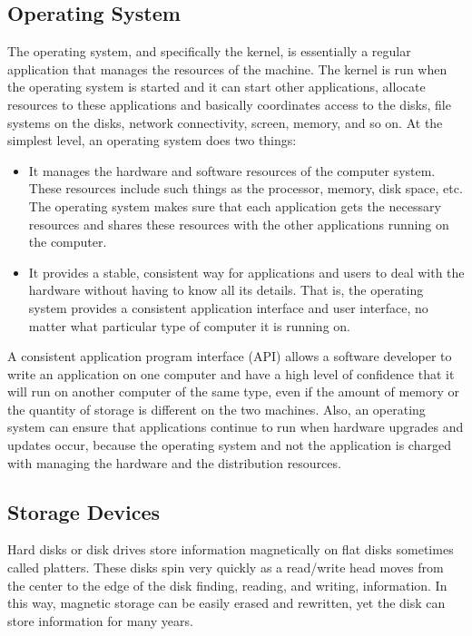 \subsection{Operating System} The operating system, and specifically
the kernel, is essentially a regular application that manages the
resources of the machine. The kernel is run when the operating system
is started and it can start other applications, allocate resources to
these applications and basically coordinates access to the disks, file
systems on the disks, network connectivity, screen, memory, and so on.
At the simplest level, an operating system does two things:
\begin{itemize}
\item It manages the hardware and software resources of the computer
  system.  These resources include such things as the processor,
  memory, disk space, etc.  The operating system makes sure that each
  application gets the necessary resources and shares these resources
  with the other applications running on the computer.

\item It provides a stable, consistent way for applications and users
  to deal with the hardware without having to know all its details.
  That is, the operating system provides a consistent application
  interface and user interface, no matter what particular type of
  computer it is running on.
\end{itemize}

A consistent application program interface (API) allows a software
developer to write an application on one computer and have a high
level of confidence that it will run on another computer of the same
type, even if the amount of memory or the quantity of storage is
different on the two machines.  Also, an operating system can ensure
that applications continue to run when hardware upgrades and updates
occur, because the operating system and not the application is charged
with managing the hardware and the distribution resources.


\subsection{Storage Devices}
Hard disks or disk drives store information magnetically on flat disks
sometimes called platters.  These disks spin very quickly as a
read/write head moves from the center to the edge of the disk finding,
reading, and writing, information.  In this way, magnetic storage can
be easily erased and rewritten, yet the disk can store information for
many years.

